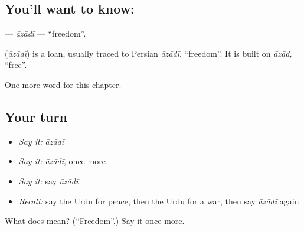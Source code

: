 \subsection*{You'll want to know: }
\textbf{} — \emph{āzādī} — \textquotedblleft{}freedom\textquotedblright{}.

\begin{cousinweb}
\textbf{} (\emph{āzādī}) is a loan, usually traced to Persian \emph{āzādī}, \textquotedblleft{}freedom\textquotedblright{}. It is built on \emph{āzād}, \textquotedblleft{}free\textquotedblright{}.
\end{cousinweb}

\begin{grammarlens}[title={What you've built}]
One more word for this chapter.
\end{grammarlens}

\subsection*{Your turn}
\begin{itemize}
\raggedright
  \item \emph{Say it:} \emph{āzādī}
  \item \emph{Say it:} \emph{āzādī}, once more
  \item \emph{Say it:} say \emph{āzādī}
  \item \emph{Recall:} say the Urdu for peace, then the Urdu for a war, then say \emph{āzādī} again
\end{itemize}

\begin{tcolorbox}[breakable,colback=teal!4,colframe=teal!35!black,title={Before you move on}]
What does  mean? (\textquotedblleft{}Freedom\textquotedblright{}.) Say it once more.
\end{tcolorbox}

